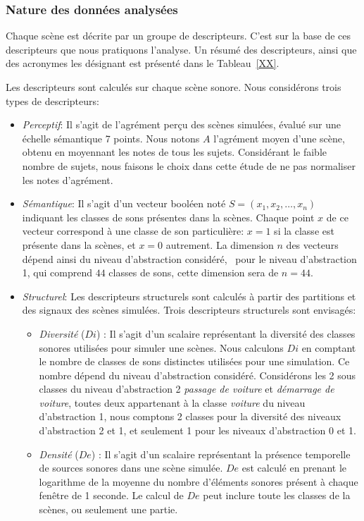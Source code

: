 \subsubsection{Nature des données analysées}

Chaque scène est décrite par un groupe de descripteurs. C'est sur la base de ces descripteurs que nous pratiquons l'analyse. Un résumé des descripteurs, ainsi que des acronymes les désignant est présenté dans le Tableau~\ref{XX}.

Les descripteurs sont calculés sur chaque scène sonore. Nous considérons trois types de descripteurs:

\begin{itemize}
\item \emph{Perceptif}: Il s'agit de l'agrément perçu des scènes simulées, évalué sur une échelle sémantique 7 points. Nous notons $A$ l'agrément moyen d'une scène, obtenu en moyennant les notes de tous les sujets. Considérant le faible nombre de sujets, nous faisons le choix dans cette étude de ne pas normaliser les notes d'agrément.
\item \emph{Sémantique}: Il s'agit d'un vecteur booléen noté $S=(x_1,x_2,\ldots,x_n)$ indiquant les classes de sons présentes dans la scènes. Chaque point $x$ de ce vecteur correspond à une classe de son particulière: $x=1$ si la classe est présente dans la scènes, et $x=0$ autrement. La dimension $n$ des vecteurs dépend ainsi du niveau d'abstraction considéré, \eg~pour le niveau d'abstraction 1, qui comprend $44$ classes de sons, cette dimension sera de $n=44$.
\item \emph{Structurel}: Les descripteurs structurels sont calculés à partir des partitions et des signaux des scènes simulées. Trois descripteurs structurels sont envisagés:
\begin{itemize}
\item \emph{Diversité} ($Di$) : Il s'agit d'un scalaire représentant la diversité des classes sonores utilisées pour simuler une scènes. Nous calculons $Di$ en comptant le nombre de classes de sons distinctes utilisées pour une simulation. Ce nombre dépend du niveau d'abstraction considéré. Considérons les 2 sous classes du niveau d'abstraction 2 \emph{passage de voiture} et \emph{démarrage de voiture}, toutes deux appartenant à la classe \emph{voiture} du niveau d'abstraction 1, nous comptons 2 classes pour la diversité des niveaux d'abstraction 2 et 1, et seulement 1 pour les niveaux d'abstraction 0 et 1.
\item \emph{Densité} ($De$) : Il s'agit d'un scalaire représentant la présence temporelle de sources sonores dans une scène simulée. $De$ est calculé en prenant le logarithme de la moyenne du nombre d'éléments sonores présent à chaque fenêtre de 1 seconde. Le calcul de $De$ peut inclure toute les classes de la scènes, ou seulement une partie.

\end{itemize}
\end{itemize}
